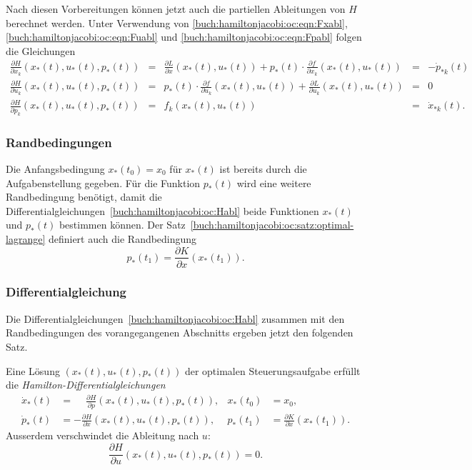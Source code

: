 Nach diesen Vorbereitungen können jetzt auch die partiellen Ableitungen
von $H$ berechnet werden.
Unter Verwendung von 
\eqref{buch:hamiltonjacobi:oc:eqn:Fxabl},
\eqref{buch:hamiltonjacobi:oc:eqn:Fuabl}
und
\eqref{buch:hamiltonjacobi:oc:eqn:Fpabl}
folgen die Gleichungen
\begin{equation}
\renewcommand{\arraycolsep}{2pt}
\renewcommand{\arraystretch}{2.0}
\begin{array}{rclcl}
\displaystyle
\frac{\partial H}{\partial x_k}(x_*(t),u_*(t),p_*(t))
&=&
\displaystyle
\frac{\partial L}{\partial x}(x_*(t),u_*(t))
+
p_*(t)\cdot\frac{\partial f}{\partial x_k}(x_*(t),u_*(t))
&=&-\dot{p}_{*k}(t)
\\
\displaystyle
\frac{\partial H}{\partial u_k}(x_*(t),u_*(t),p_*(t))
&=&
\displaystyle
p_*(t)\cdot
\frac{\partial f}{\partial u_k}(x_*(t),u_*(t))
+
\frac{\partial L}{\partial u_k}(x_*(t),u_*(t))
&=&0
\\
\displaystyle
\frac{\partial H}{\partial p_k}(x_*(t),u_*(t),p_*(t))
&=&
f_k(x_*(t),u_*(t))
&=&
\dot{x}_{*k}(t).
\end{array}
\label{buch:hamiltonjacobi:oc:Habl}
\end{equation}

%
%
\subsubsection{Randbedingungen}
Die Anfangsbedingung $x_*(t_0)=x_0$ für $x_*(t)$ ist bereits durch
die Aufgabenstellung gegeben.
Für die Funktion $p_*(t)$ wird eine weitere Randbedingung benötigt,
damit die Differentialgleichungen~\eqref{buch:hamiltonjacobi:oc:Habl}
beide Funktionen $x_*(t)$ und $p_*(t)$ bestimmen können.
Der Satz~\ref{buch:hamiltonjacobi:oc:satz:optimal-lagrange}
definiert auch die Randbedingung
\[
p_*(t_1)
=
\frac{\partial K}{\partial x}(x_*(t_1)).
\]

%
%
\subsubsection{Differentialgleichung}
Die Differentialgleichungen~\eqref{buch:hamiltonjacobi:oc:Habl} zusammen
mit den Randbedingungen des vorangegangenen Abschnitts ergeben jetzt
den folgenden Satz.

\begin{satz}
\label{buch:hamiltonjacobi:oc:satz:hamilton-gleichungen}
Eine Lösung $(x_*(t),u_*(t),p_*(t))$ der optimalen Steuerungsaufgabe
erfüllt die {\em Hamilton-Differentialgleichungen}
\begin{align*}
\dot{x}_*(t)
&=
\phantom{-}
\frac{\partial H}{\partial p}(x_*(t),u_*(t),p_*(t)),
&
x_*(t_0)
&=
x_0,
\\
\dot{p}_*(t)
&=
-
\frac{\partial H}{\partial x}(x_*(t),u_*(t),p_*(t)),
&
p_*(t_1)
&=
\frac{\partial K}{\partial x}(x_*(t_1)).
\end{align*}
Ausserdem verschwindet die Ableitung nach $u$:
\begin{equation}
\frac{\partial H}{\partial u}(x_*(t),u_*(t),p_*(t))=0.
\label{buch:hamiltonjacobi:oc:eqn:ablHu0}
\end{equation}
\end{satz}

